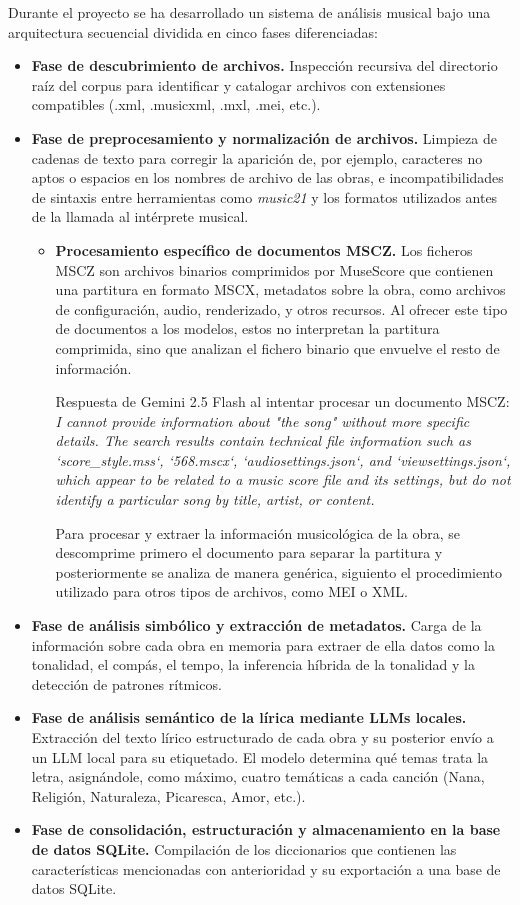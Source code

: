 Durante el proyecto se ha desarrollado un sistema de análisis musical bajo una arquitectura secuencial dividida en cinco fases diferenciadas:
\begin{itemize}
\item \textbf{Fase de descubrimiento de archivos.} Inspección recursiva del directorio raíz del corpus para identificar y catalogar archivos con extensiones compatibles (.xml, .musicxml, .mxl, .mei, etc.).
\item \textbf{Fase de preprocesamiento y normalización de archivos.} Limpieza de cadenas de texto para corregir la aparición de, por ejemplo, caracteres no aptos o espacios en los nombres de archivo de las obras, e incompatibilidades de sintaxis entre herramientas como \textit{music21} y los formatos utilizados antes de la llamada al intérprete musical.
\begin{itemize}
\item \textbf{Procesamiento específico de documentos MSCZ.} Los ficheros MSCZ son archivos binarios comprimidos por MuseScore que contienen una partitura en formato MSCX, metadatos sobre la obra, como archivos de configuración, audio, renderizado, y otros recursos. Al ofrecer este tipo de documentos a los modelos, estos no interpretan la partitura comprimida, sino que analizan el fichero binario que envuelve el resto de información. 

Respuesta de Gemini 2.5 Flash al intentar procesar un documento MSCZ:
\textit{I cannot provide information about "the song" without more specific details. The search results contain technical file information such as `score\_style.mss`, `568.mscx`, `audiosettings.json`, and `viewsettings.json`, which appear to be related to a music score file and its settings, but do not identify a particular song by title, artist, or content.}

Para procesar y extraer la información musicológica de la obra, se descomprime primero el documento para separar la partitura y posteriormente se analiza de manera genérica, siguiento el procedimiento utilizado para otros tipos de archivos, como MEI o XML.
\end{itemize}
\item \textbf{Fase de análisis simbólico y extracción de metadatos.} Carga de la información sobre cada obra en memoria para extraer de ella datos como la tonalidad, el compás, el tempo, la inferencia híbrida de la tonalidad y la detección de patrones rítmicos.
\item \textbf{Fase de análisis semántico de la lírica mediante LLMs locales.} Extracción del texto lírico estructurado de cada obra y su posterior envío a un LLM local para su etiquetado. El modelo determina qué temas trata la letra, asignándole, como máximo, cuatro temáticas a cada canción (Nana, Religión, Naturaleza, Picaresca, Amor, etc.).
\item \textbf{Fase de consolidación, estructuración y almacenamiento en la base de datos SQLite.} Compilación de los diccionarios que contienen las características mencionadas con anterioridad y su exportación a una base de datos SQLite.
\end{itemize}

